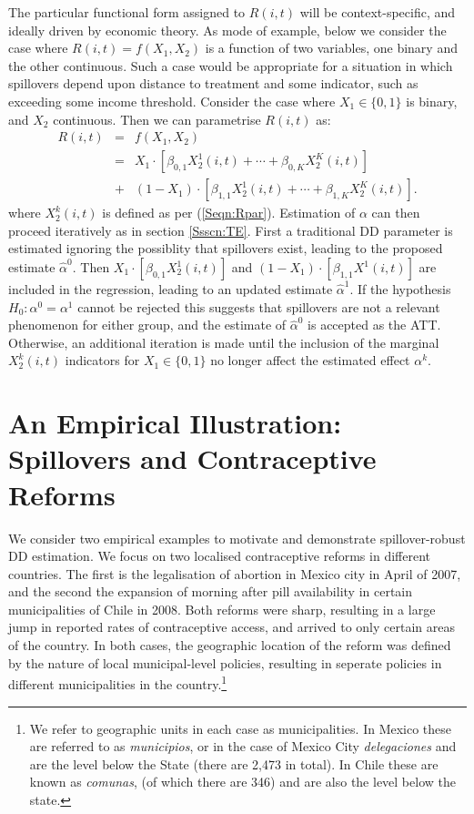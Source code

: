 The particular functional form assigned to $R(i,t)$ will be context-specific,
and ideally driven by economic theory.  As mode of example, below we consider the
case where $R(i,t)=f(X_1,X_2)$ is a function of two variables, one binary and
the other continuous.  Such a case would be appropriate for a situation in which
spillovers depend upon distance to treatment and some indicator, such as exceeding
some income threshold.  Consider the case where $X_1\in \{0,1\}$ is binary, and 
$X_2$ continuous.  Then we can parametrise $R(i,t)$ as:
\begin{eqnarray}
R(i,t)&=&f(X_1,X_2) \nonumber \\
      &=&X_1\cdot[\beta_{0,1}X_2^1(i,t)+ \cdots + \beta_{0,K}X_2^K(i,t)] \nonumber \\
      &+& (1-X_1)\cdot[\beta_{1,1}X_2^1(i,t)+ \cdots + \beta_{1,K}X_2^K(i,t)]. \nonumber
\end{eqnarray}
where $X_2^k(i,t)$ is defined as per (\ref{Seqn:Rpar}).  Estimation of $\alpha$ 
can then proceed iteratively as in section \ref{Ssscn:TE}.  First a traditional 
DD parameter is estimated ignoring the possiblity that spillovers exist, leading 
to the proposed estimate $\hat\alpha^0$.  Then $X_1\cdot[\beta_{0,1}X_2^1(i,t)]$ 
and $(1-X_1)\cdot[\beta_{1,1}X^1(i,t)]$ are included in the regression, leading to 
an updated estimate $\hat\alpha^1$.  If the hypothesis $H_0: \alpha^0=\alpha^1$ 
cannot be rejected this suggests that spillovers are not a relevant phenomenon 
for either group, and the estimate of $\hat\alpha^0$ is accepted as the ATT.  
Otherwise, an additional iteration is made until the inclusion of the marginal 
$X_2^k(i,t)$ indicators for $X_1 \in \{0,1\}$ no longer affect the estimated 
effect $\alpha^k$.

\section{An Empirical Illustration: Spillovers and Contraceptive Reforms}
We consider two empirical examples to motivate and demonstrate spillover-robust 
DD estimation.
We focus on two localised contraceptive reforms in different countries. The first
is the legalisation of abortion in Mexico city in April of 2007, and the second
the expansion of morning after pill availability in certain municipalities of 
Chile in 2008.  Both reforms were sharp, resulting in a large jump in reported
rates of contraceptive access, and arrived to only certain areas of the country.
In both cases, the geographic location of the reform was defined by the nature
of local municipal-level policies, resulting in seperate policies in different
municipalities in the country.\footnote{We refer to geographic units in each case
as municipalities.  In Mexico these are referred to as \emph{municipios}, or in 
the case of Mexico City \emph{delegaciones} and are the level below the State 
(there are 2,473 in total).  In Chile these are known as \emph{comunas}, (of 
which there are 346) and are also the level below the state.}

